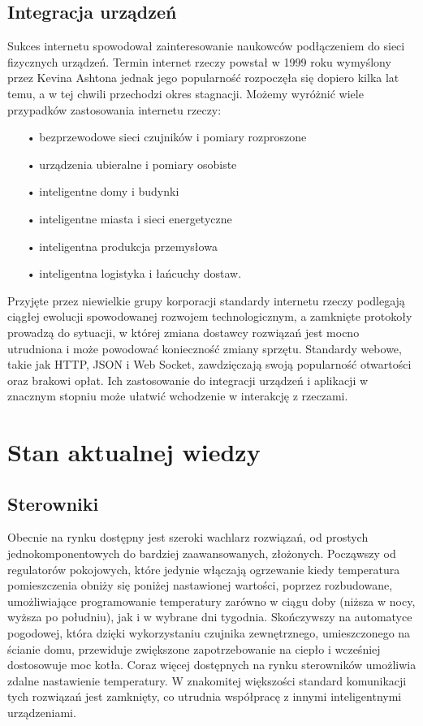\documentclass[11pt]{report}
\begin{document}
 \subsection{Integracja urządzeń}
 Sukces internetu spowodował zainteresowanie naukowców podłączeniem do sieci fizycznych urządzeń.
 Termin internet rzeczy powstał w 1999 roku wymyślony przez Kevina Ashtona \cite{Ashton2009} jednak jego popularność rozpoczęła się dopiero kilka lat temu, a w tej chwili przechodzi okres stagnacji.
 Możemy wyróżnić wiele przypadków zastosowania internetu rzeczy:
 \begin{enumerate}
 \item[•] bezprzewodowe sieci czujników i pomiary rozproszone
 \item[•] urządzenia ubieralne i pomiary osobiste
 \item[•] inteligentne domy i budynki
 \item[•] inteligentne miasta i sieci energetyczne
 \item[•] inteligentna produkcja przemysłowa
 \item[•] inteligentna logistyka i łańcuchy dostaw.
\end{enumerate}
 Przyjęte przez niewielkie grupy korporacji standardy internetu rzeczy podlegają ciągłej ewolucji spowodowanej rozwojem technologicznym, a zamknięte protokoły prowadzą do sytuacji, w której zmiana dostawcy rozwiązań jest mocno utrudniona i może powodować konieczność zmiany sprzętu. Standardy webowe, takie jak HTTP, JSON i Web Socket, zawdzięczają swoją popularność otwartości oraz brakowi opłat. Ich zastosowanie do integracji urządzeń i aplikacji w znacznym stopniu może ułatwić wchodzenie w interakcję z rzeczami.
 
 \section{Stan aktualnej wiedzy}
 \subsection{Sterowniki}
 Obecnie na rynku dostępny jest szeroki wachlarz rozwiązań, od prostych jednokomponentowych do bardziej zaawansowanych, złożonych. Począwszy od regulatorów pokojowych, które jedynie włączają ogrzewanie kiedy temperatura pomieszczenia obniży się poniżej nastawionej wartości, poprzez rozbudowane, umożliwiające programowanie temperatury zarówno w ciągu doby (niższa w nocy, wyższa po południu), jak i w wybrane dni tygodnia. Skończywszy na automatyce pogodowej, która dzięki wykorzystaniu czujnika zewnętrznego, umieszczonego na ścianie domu, przewiduje zwiększone zapotrzebowanie na ciepło i wcześniej dostosowuje moc kotła.
 Coraz więcej dostępnych na rynku sterowników umożliwia zdalne nastawienie temperatury. W znakomitej większości standard komunikacji tych rozwiązań jest zamknięty, co utrudnia współpracę  z innymi inteligentnymi urządzeniami.
\end{document}
